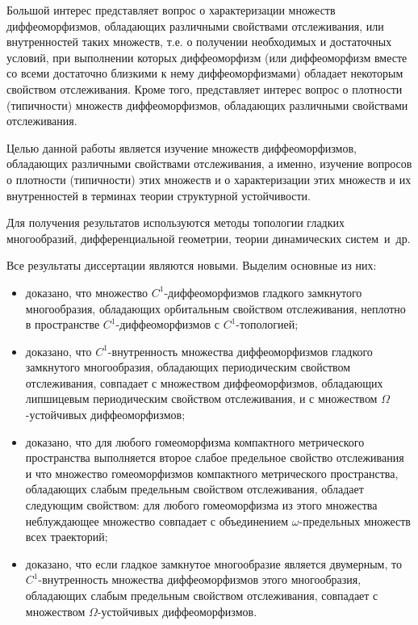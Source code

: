 \documentclass[12pt]{article}
\begin{document}
{%
Боль\-шой интерес представляет вопрос о характеризации множеств диффеоморфизмов, об\-ла\-да\-ющ\-их различными свойствами отслеживания, или внутренностей таких множеств, т.е. о получении необходимых и достаточных условий, при выполнении которых диффеоморфизм (или диффеоморфизм вместе со всеми достаточно близкими к нему диффео\-мор\-физ\-мами) обладает некоторым свойством отслеживания. Кроме того, представляет интерес вопрос о плотности (типичности) множеств диффеоморфизмов, обладающих различными свойствами отслеживания.

 Целью данной работы является изучение множеств диффеоморфизмов, обладающих различными свойствами отслеживания, а именно, изучение вопросов о плотности (типичности) этих множеств и о характеризации этих множеств и их внутренностей в терминах теории структурной устойчивости.

 Для получения результатов исполь\-зу\-ют\-ся методы топологии гладких многообразий, дифференциальной гео\-метрии, теории динамических систем~и~др.

 Все результаты дис\-сер\-та\-ции являются новыми. Выделим основные из них:

\begin{itemize}
	\item[--] доказано, что множество $C^1$-диффеоморфизмов глад\-кого замкнутого многообразия, обладающих орбиталь\-ным свойством отслеживания, неплотно в пространстве $C^1$-диффеомор\-физмов с $C^1$-топологией;
	\item[--] доказано, что $C^1$-внутренность множества диффеоморфизмов гладкого замкнутого многообразия, обладающих пе\-ри\-о\-ди\-ческим свойством отслеживания, совпадает с множеством диф\-фео\-морфизмов, обладающих липшицевым периодическим свойс\-т\-вом отслеживания, и с множеством $\Omega$-устойчивых диф\-фео\-мор\-физ\-мов;
	\item[--] доказано, что для любого гомеоморфизма компактного метрического прос\-транства выполняется второе слабое предельное свойство от\-сле\-живания и что множество гомеоморфизмов компактного мет\-рического пространства, обладающих слабым предельным свойством от\-слеживания, обладает следующим свойством: для любого гомео\-морфизма из этого множества неблуждающее множество совпадает с объединением $\omega$-предельных множеств всех траекторий;
	\item[--] доказано, что если гладкое замкнутое многообразие является дву\-мер\-ным, то $C^1$-внутренность множества диффеоморфизмов это\-го многообразия, обладающих слабым предельным свойством отслеживания, совпадает с множеством $\Omega$-устойчивых диф\-фео\-мор\-физмов. 
\end{itemize}

}
\end{document}
